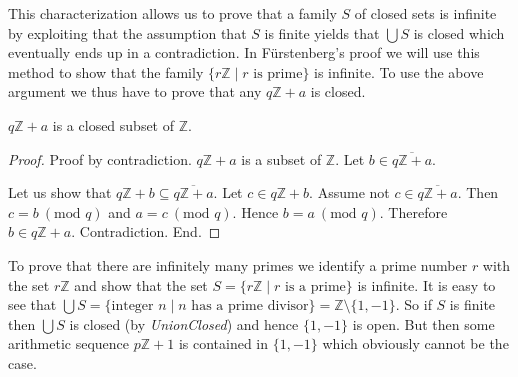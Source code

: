 \documentclass{article}
\renewcommand{\mod}{\text{mod }}
\newcommand{\Int}{\mathbb{Z}}
\begin{document}
  This characterization allows us to prove that a family $S$ of closed sets is infinite by exploiting that the assumption that $S$ is finite yields that $\bigcup S$ is closed which eventually ends up in a contradiction. In Fürstenberg's proof we will use this method to show that the family $\{ r \Int \mid r \text{ is prime} \}$ is infinite. To use the above argument we thus have to prove that any $q \Int + a$ is closed.

  \begin{forthel}
    \begin{lemma}[ArSeqClosed]
      $q \Int + a$ is a closed subset of $\Int$.
    \end{lemma}
    \begin{proof}
      Proof by contradiction. $q \Int + a$ is a subset of $\Int$. Let $b \in \overline{q \Int + a}$.

      Let us show that $q \Int + b \subseteq \overline{q \Int + a}$. Let $c \in q \Int + b$.
        Assume not $c \in \overline{q \Int + a}$. Then $c = b ~(\mod q)$ and $a = c ~(\mod q)$. Hence $b = a ~(\mod q)$. Therefore $b \in q \Int + a$. Contradiction.
      End.
    \end{proof}
  \end{forthel}

  To prove that there are infinitely many primes we identify a prime number $r$ with the set $r \Int$ and show that the set $S = \{r \Int \mid r \textrm{ is a prime} \}$ is infinite. It is easy to see that $\bigcup S = \{ \text{integer } n \mid n \text{ has a prime divisor} \} = \Int \setminus \{ 1, -1 \}$. So if $S$ is finite then $\bigcup S$ is closed (by \textit{UnionClosed}) and hence $\{ 1, -1 \}$ is open. But then some arithmetic sequence $p \Int + 1$ is contained in $\{ 1, -1 \}$ which obviously cannot be the case.
\end{document}
